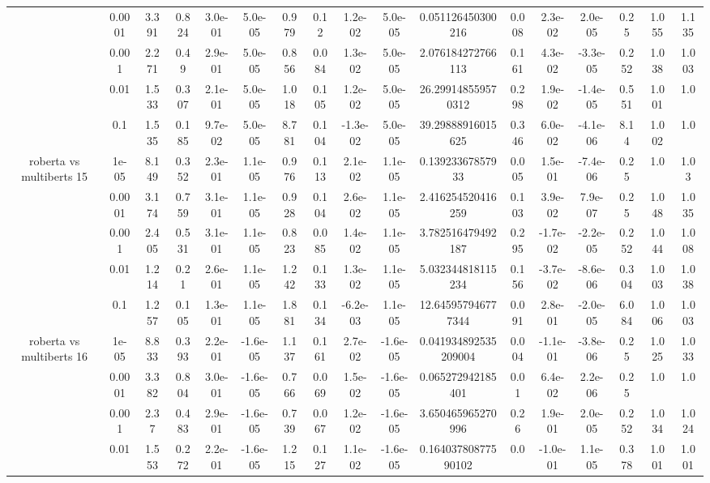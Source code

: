 \begin{tabular}{|c|c|c|c|c|c|c|c|c|c|c|c|c|c|c|c|c|}
 & 0.0001 & 3.391 & 0.824 & 3.0e-01 & 5.0e-05 & 0.979 & 0.12 & 1.2e-02 & 5.0e-05 & 0.051126450300216 & 0.008 & 2.3e-02 & 2.0e-05 & 0.25 & 1.055 & 1.135 \\
 & 0.001 & 2.271 & 0.49 & 2.9e-01 & 5.0e-05 & 0.856 & 0.084 & 1.3e-02 & 5.0e-05 & 2.076184272766113 & 0.161 & 4.3e-02 & -3.3e-05 & 0.252 & 1.038 & 1.003 \\
 & 0.01 & 1.533 & 0.307 & 2.1e-01 & 5.0e-05 & 1.018 & 0.105 & 1.2e-02 & 5.0e-05 & 26.299148559570312 & 0.298 & 1.9e-02 & -1.4e-05 & 0.551 & 1.001 & 1.0 \\
 & 0.1 & 1.535 & 0.185 & 9.7e-02 & 5.0e-05 & 8.781 & 0.104 & -1.3e-02 & 5.0e-05 & 39.29888916015625 & 0.346 & 6.0e-02 & -4.1e-06 & 8.14 & 1.002 & 1.0 \\
\hline
\multirow{5}{*}{roberta  vs multiberts 15} & 1e-05 & 8.149 & 0.352 & 2.3e-01 & 1.1e-05 & 0.976 & 0.113 & 2.1e-02 & 1.1e-05 & 0.13923367857933 & 0.005 & 1.5e-01 & -7.4e-06 & 0.25 & 1.0 & 1.03 \\
 & 0.0001 & 3.174 & 0.759 & 3.1e-01 & 1.1e-05 & 0.928 & 0.104 & 2.6e-02 & 1.1e-05 & 2.416254520416259 & 0.103 & 3.9e-02 & 7.9e-07 & 0.25 & 1.048 & 1.035 \\
 & 0.001 & 2.405 & 0.531 & 3.1e-01 & 1.1e-05 & 0.823 & 0.085 & 1.4e-02 & 1.1e-05 & 3.782516479492187 & 0.295 & -1.7e-02 & -2.2e-05 & 0.252 & 1.044 & 1.008 \\
 & 0.01 & 1.214 & 0.21 & 2.6e-01 & 1.1e-05 & 1.242 & 0.133 & 1.3e-02 & 1.1e-05 & 5.032344818115234 & 0.156 & -3.7e-02 & -8.6e-06 & 0.304 & 1.003 & 1.038 \\
 & 0.1 & 1.257 & 0.105 & 1.3e-01 & 1.1e-05 & 1.881 & 0.134 & -6.2e-03 & 1.1e-05 & 12.645957946777344 & 0.091 & 2.8e-01 & -2.0e-05 & 6.084 & 1.006 & 1.003 \\
\hline
\multirow{5}{*}{roberta  vs multiberts 16} & 1e-05 & 8.833 & 0.393 & 2.2e-01 & -1.6e-05 & 1.137 & 0.161 & 2.7e-02 & -1.6e-05 & 0.041934892535209004 & 0.004 & -1.1e-01 & -3.8e-06 & 0.25 & 1.025 & 1.033 \\
 & 0.0001 & 3.382 & 0.804 & 3.0e-01 & -1.6e-05 & 0.766 & 0.069 & 1.5e-02 & -1.6e-05 & 0.065272942185401 & 0.01 & 6.4e-02 & 2.2e-06 & 0.25 & 1.0 & 1.0 \\
 & 0.001 & 2.37 & 0.483 & 2.9e-01 & -1.6e-05 & 0.739 & 0.067 & 1.2e-02 & -1.6e-05 & 3.650465965270996 & 0.26 & 1.9e-01 & 2.0e-05 & 0.252 & 1.034 & 1.024 \\
 & 0.01 & 1.553 & 0.272 & 2.2e-01 & -1.6e-05 & 1.215 & 0.127 & 1.1e-02 & -1.6e-05 & 0.16403780877590102 & 0.0 & -1.0e-01 & 1.1e-05 & 0.378 & 1.001 & 1.001 \\

\end{tabular}
